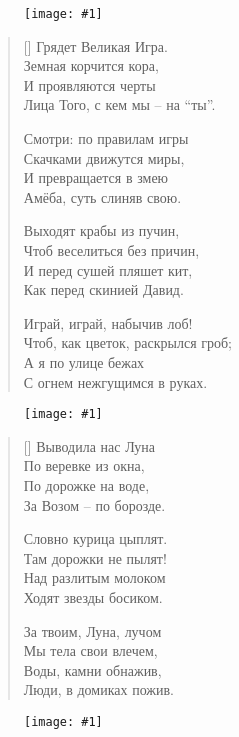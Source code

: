 \documentclass[12pt,a5paper,twoside]{article}
\newcommand{\pict}[1]{\thispagestyle{empty}\begin{figure}[H]\begin{center}\texttt{[image: \#1]}\end{center}\end{figure}\newpage}
\begin{document}
\pict{picts/Gryadet_Velikaya_Igra} 
%
	
\settowidth{\versewidth}{Грядет Великая Игра.}
\begin{verse}[\versewidth]
Грядет Великая Игра.\\
Земная корчится кора,\\
И проявляются черты\\
Лица Того, с кем мы – на “ты”.

Смотри: по правилам игры\\
Скачками движутся миры,\\
И превращается в змею\\
Амёба, суть слиняв свою.

Выходят крабы из пучин,\\
Чтоб веселиться без причин,\\
И перед сушей пляшет кит,\\
Как перед скинией Давид.

Играй, играй, набычив лоб!\\
Чтоб, как цветок, раскрылся гроб;\\
А я по улице бежах\\
С огнем нежгущимся в руках.
\end{verse}
\newpage



\pict{picts/Vivodila_nas_Luna} 
%



\settowidth{\versewidth}{Выводила нас Луна}
\begin{verse}[\versewidth]
Выводила нас Луна\\
По веревке из окна,\\
По дорожке на воде,\\
За Возом – по борозде.

Словно курица цыплят.\\
Там дорожки не пылят!\\
Над разлитым молоком\\
Ходят звезды босиком.

За твоим, Луна, лучом\\
Мы тела свои влечем,\\
Воды, камни обнажив,\\
Люди, в домиках пожив.
\end{verse}
\newpage




\pict{picts/Begstvo_v_Egipet} 
%
\end{document}
